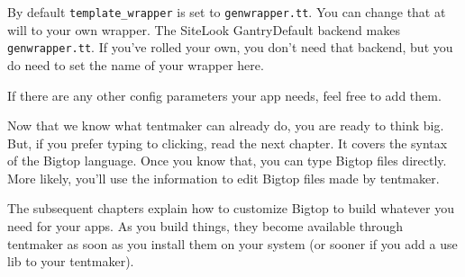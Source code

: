 By default \verb+template_wrapper+ is set to \verb+genwrapper.tt+.  You
can change that at will to your own wrapper.  The SiteLook GantryDefault
backend makes \verb+genwrapper.tt+.  If you've rolled your own, you don't
need that backend, but you do need to set the name of your wrapper here.

If there are any other config parameters your app needs, feel free to
add them.

Now that we know what tentmaker can already do, you are ready to think big.
But, if you prefer typing to clicking, read the next chapter.  It covers
the syntax of the Bigtop language.  Once you know that, you can type Bigtop
files directly.  More likely, you'll use the information to edit Bigtop
files made by tentmaker.

The subsequent chapters explain how to customize Bigtop to build whatever
you need for your apps.  As you build things, they become available
through tentmaker as soon as you install them on your system (or sooner
if you add a use lib to your tentmaker).
